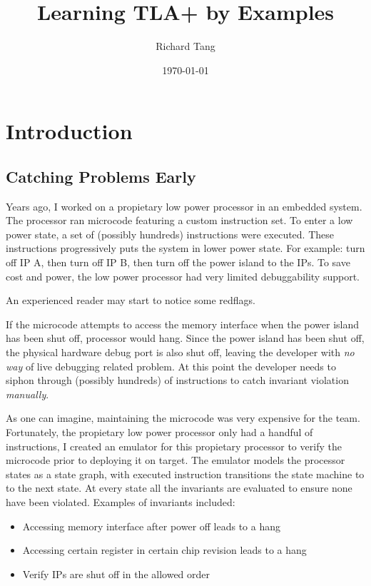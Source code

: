 \documentclass{report}
\title{Learning TLA+ by Examples}
\author{Richard Tang}
\date{\today}
\begin{document}
\maketitle
\tableofcontents

\chapter{Introduction}

\section{Catching Problems Early}

Years ago, I worked on a propietary low power processor in an embedded system.
The processor ran microcode featuring a custom instruction set. To enter a low
power state, a set of (possibly hundreds) instructions were executed. These
instructions progressively puts the system in lower power state. For example:
turn off IP A, then turn off IP B, then turn off the power island to the IPs. To
save cost and power, the low power processor had very limited debuggability
support.\newline

An experienced reader may start to notice some redflags.\newline

If the microcode attempts to access the memory interface when the power island
has been shut off, processor would hang. Since the power island has been shut
off, the physical hardware debug port is also shut off, leaving the developer
with \textit{no way} of live debugging related problem. At this point the
developer needs to siphon through (possibly hundreds) of instructions to catch
invariant violation \textit{manually}.\newline

As one can imagine, maintaining the microcode was very expensive for the team.
Fortunately, the propietary low power processor only had a handful of
instructions, I created an emulator for this propietary processor to verify the
microcode prior to deploying it on target. The emulator models the processor
states as a state graph, with executed instruction transitions the state machine
to to the next state. At every state all the invariants are evaluated to ensure
none have been violated. Examples of invariants included:
\begin{itemize}
    \item Accessing memory interface after power off leads to a hang
    \item Accessing certain register in certain chip revision leads to a hang 
    \item Verify IPs are shut off in the allowed order
\end{itemize}
\end{document}
